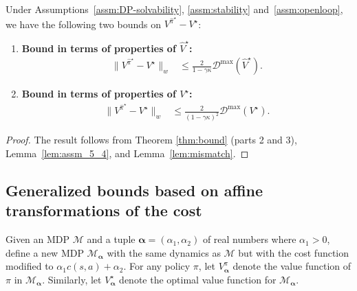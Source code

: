 \documentclass[letterpaper, 10pt]{IEEEtran}
\newcommand*\ALPHABET{\mathcal}
\newcommand*\MISMATCH{\mathscr{D}}
\newcommand*\scale{(\alpha_1,\alpha_2)}
\begin{document}
\begin{theorem}\label{thm:openloop bound}
   Under Assumptions~\ref{assm:DP-solvability}, \ref{assm:stability} and~\ref{assm:openloop}, we have the following two bounds on $V^{\hat \pi^\star} - V^\star$:
   \begin{enumerate}
       \item \textbf{Bound in terms of properties of $\hat V^\star$:}
       \begin{align*}
          \bigl\| V^{\hat \pi^\star} - V^\star \bigr\|_w
             &\leq \frac{2}{1-\gamma\kappa} \MISMATCH^{\max}(\hat V^\star).
       \end{align*}
       \item \textbf{Bound in terms of properties of $V^\star$:}
       \begin{align*}
          \bigl\| V^{\hat \pi^\star} - V^\star \bigr\|_w
             &\leq \frac{2}{(1-\gamma\kappa)^2} \MISMATCH^{\max}(V^\star).
       \end{align*}
   \end{enumerate}
\end{theorem}
\begin{proof}
    The result follows from Theorem \ref{thm:bound} (parts 2 and 3), Lemma~\ref{lem:assm_5_4}, and Lemma~\ref{lem:mismatch}.
\end{proof}

\subsection{Generalized  bounds based on affine transformations of the cost}
\label{sec:alpha_beta}

Given an MDP $\ALPHABET M$ and a tuple $\boldsymbol{\alpha} = \scale$ of real numbers where $\alpha_1 > 0$, define a new MDP $\ALPHABET M_{\boldsymbol{\alpha}}$ with the same dynamics as $\ALPHABET M$ but with the cost function  modified to $\alpha_1  c(s,a) + \alpha_2$. For any policy $\pi$, let $V^\pi_{\boldsymbol{\alpha}}$ denote the value function of $\pi$ in $\ALPHABET M_{\boldsymbol{\alpha}}$. Similarly, let $V^\star_{\boldsymbol{\alpha}}$ denote the optimal value function for $\ALPHABET M_{\boldsymbol{\alpha}}$. 
\end{document}
